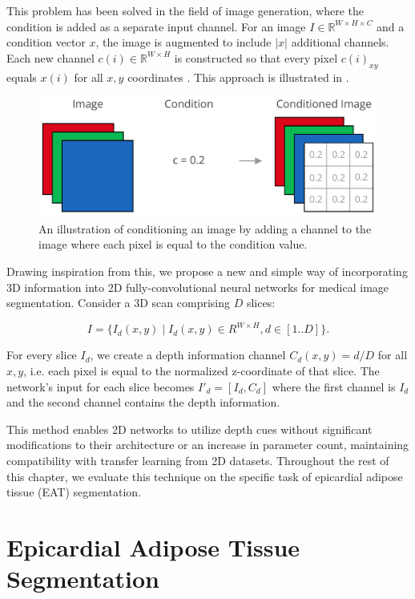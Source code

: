 This problem has been solved in the field of image generation, where the condition is added as a separate input channel. For an image \(I \in \mathbb{R}^{W \times H \times C}\) and a condition vector \(x\), the image is augmented to include \(\lvert x \rvert\) additional channels. Each new channel \(c(i) \in \mathbb{R}^{W \times H}\) is constructed so that every pixel \(c(i)_{xy}\) equals \(x(i)\) for all \(x, y\) coordinates \cite{mirzaConditionalGenerativeAdversarial2014}. This approach is illustrated in .

\begin{figure}[h]
    \centering
    \includegraphics[width=0.65\columnwidth]{images/6/conditioned-image}
    \caption{An illustration of conditioning an image by adding a channel to the image where each pixel is equal to the condition value.}
    \label{fig:conditioned-image}
\end{figure}

Drawing inspiration from this, we propose a new and simple way of incorporating 3D information into 2D fully-convolutional neural networks for medical image segmentation. Consider a 3D scan comprising \(D\) slices:

\begin{equation}
	I = \{I_d(x, y)\; \vert\;  I_d(x,y) \in R^{W \times H}, d \in [1..D]\}.
\end{equation}

For every slice \(I_d\), we create a depth information channel \(C_d(x, y) = d / D\) for all \(x, y\), i.e. each pixel is equal to the normalized z-coordinate of that slice. The network's input for each slice becomes $I'_{d} = [I_d, C_d]$ where the first channel is $I_d$ and the second channel contains the depth information.

This method enables 2D networks to utilize depth cues without significant modifications to their architecture or an increase in parameter count, maintaining compatibility with transfer learning from 2D datasets. Throughout the rest of this chapter, we evaluate this technique on the specific task of epicardial adipose tissue (EAT) segmentation.

\section{Epicardial Adipose Tissue Segmentation}

